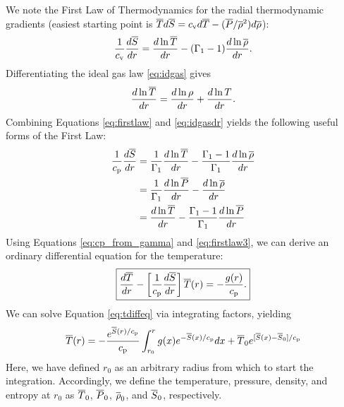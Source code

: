\documentclass[12pt]{article} %
\begin{document}
	We note the First Law of Thermodynamics for the radial thermodynamic gradients (easiest starting point is $\overline{T} d\overline{S}=c_{\rm{v}} d\overline{T}-(\overline{P}/\overline{\rho}^2)d\overline{\rho}$):
	\begin{align}
	\frac{1}{c_{\rm{v}}}\frac{d\overline{S}}{dr} =\frac{d\ln\overline{T}}{dr} - (\Gamma_1 - 1)\frac{d\ln\overline{\rho}}{dr}.
	\label{eq:firstlaw}
	\end{align}
	Differentiating the ideal gas law \eqref{eq:idgas} gives
	\begin{align}
	\frac{d\ln\overline{T}}{dr} = \frac{d\ln{\rho}}{dr} + \frac{d\ln{T}}{dr}. 
	\label{eq:idgasdr}
	\end{align}
	Combining Equations \eqref{eq:firstlaw} and \eqref{eq:idgasdr} yields the following useful forms of the First Law:
	\begin{subequations}
		\begin{align}
		\frac{1}{c_{\rm{p}}}\frac{d\overline{S}}{dr} &=\frac{1}{\Gamma_1}\frac{d\ln\overline{T}}{dr} - \frac{\Gamma_1 - 1}{\Gamma_1}\frac{d\ln\overline{\rho}}{dr}\label{eq:firstlawtmprho}\\
		&=\frac{1}{\Gamma_1}\frac{d\ln\overline{P}}{dr} - \frac{d\ln\overline{\rho}}{dr}\label{eq:firstlawprsrho}\\
		&= \frac{d\ln\overline{T}}{dr} - \frac{\Gamma_1 - 1}{\Gamma_1}\frac{d\ln\overline{P}}{dr}\label{eq:firstlawtmpprs}
		\end{align}
		\label{eq:firstlaw3}
	\end{subequations}
	Using Equations \eqref{eq:cp_from_gamma} and \eqref{eq:firstlaw3}, we can derive an ordinary differential equation for the temperature:
	\begin{align}
	\boxed{
	\frac{d\overline{T}}{dr} - \left[\frac{1}{c_{\rm{p}}}\frac{d\overline{S}}{dr}\right]\overline{T}(r) = -\frac{g(r)}{c_{\rm{p}}}.
}
\label{eq:tdiffeq}
	\end{align}
	We can solve Equation \eqref{eq:tdiffeq} via integrating factors, yielding 
	\begin{align}
	\overline{T}(r) = -\frac{e^{\overline{S}(r)/c_{\rm{p}}}}{c_{\rm{p}}}\int_{r_0}^r g(x)e^{-\overline{S}(x)/c_{\rm{p}}}dx + \overline{T}_0e^{[\overline{S}(x)-\overline{S}_0]/c_{\rm{p}}}
	\label{eq:tgeneral1}
	\end{align}
	Here, we have defined $r_0$ as an arbitrary radius from which to start the integration. Accordingly, we define the temperature, pressure, density, and entropy at $r_0$ as $\overline{T}_0$, $\overline{P}_0$, $\overline{\rho}_0$, and $\overline{S}_0$, respectively.
	
\end{document}
